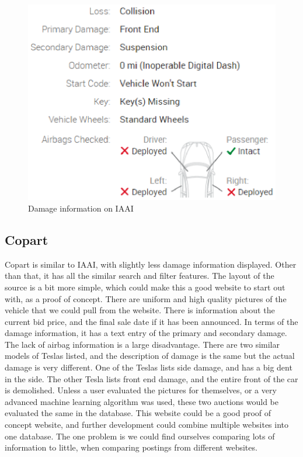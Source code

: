 \documentclass[draftclsnofoot,onecolumn,10pt]{IEEEtran}
\begin{document}
\begin{figure}[h]
\centering
\includegraphics[scale=0.5]{airbag_capture}
\caption{Damage information on IAAI}
\label{fig:airbag}
\end{figure}


\subsection{Copart}
Copart is similar to IAAI, with slightly less damage information displayed. Other than that, it has all the similar search and filter features. The layout of the source is a bit more simple, which could make this a good website to start out with, as a proof of concept. There are uniform and high quality pictures of the vehicle that we could pull from the website. There is information about the current bid price, and the final sale date if it has been announced. In terms of the damage information, it has a text entry of the primary and secondary damage. The lack of airbag information is a large disadvantage. There are two similar models of Teslas listed, and the description of damage is the same but the actual damage is very different. One of the Teslas lists side damage, and has a big dent in the side. The other Tesla lists front end damage, and the entire front of the car is demolished. Unless a user evaluated the pictures for themselves, or a very advanced machine learning algorithm was used, these two auctions would be evaluated the same in the database. This website could be a good proof of concept website, and further development could combine multiple websites into one database. The one problem is we could find ourselves comparing lots of information to little, when comparing postings from different websites. \cite{copart}
\end{document}
